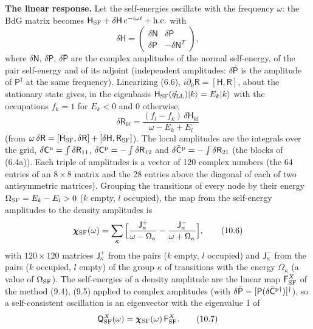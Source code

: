 \documentclass[
  10pt,
]{article}
\begin{document}
\textbf{The linear response.} Let the self-energies oscillate with the
frequency \(\omega\): the BdG matrix becomes
\(\mathsf H_{\rm SF}+\delta\mathsf H\,e^{-i\omega t}+{\rm h.c.}\) with
\[\delta\mathsf H=\begin{pmatrix}\delta\mathsf N&\delta\mathsf P\\\delta\bar{\mathsf P}&-\delta\mathsf N^T\end{pmatrix},\tag{10.4}\]
where \(\delta\mathsf N\), \(\delta\mathsf P\),
\(\delta\bar{\mathsf P}\) are the complex amplitudes of the normal
self-energy, of the pair self-energy and of its adjoint (independent
amplitudes: \(\delta\bar{\mathsf P}\) is the amplitude of
\(\mathsf P^\dagger\) at the same frequency). Linearizing (6.6),
\(i\partial_0\mathsf R=[\mathsf H,\mathsf R]\), about the stationary
state gives, in the eigenbasis
\(\mathsf H_{\rm SF}(\vec q_{\rm LL})\lvert k\rangle=E_k\lvert k\rangle\)
with the occupations \(f_k=1\) for \(E_k<0\) and \(0\) otherwise,
\[\delta\mathsf R_{kl}=\frac{(f_l-f_k)\,\delta\mathsf H_{kl}}{\omega-E_k+E_l}\tag{10.5}\]
(from
\(\omega\,\delta\mathsf R=[\mathsf H_{\rm SF},\delta\mathsf R]+[\delta\mathsf H,\mathsf R_{\rm SF}]\)).
The local amplitudes are the integrals over the grid,
\(\delta\mathsf C^{\rm n}=\int\delta\mathsf R_{11}\),
\(\delta\mathsf C^{\rm p}=-\int\delta\mathsf R_{12}\) and
\(\delta\bar{\mathsf C}^{\rm p}=-\int\delta\mathsf R_{21}\) (the blocks
of (6.4a)). Each triple of amplitudes is a vector of 120 complex numbers
(the 64 entries of an \(8\times8\) matrix and the 28 entries above the
diagonal of each of two antisymmetric matrices). Grouping the
transitions of every node by their energy \(\Omega_{\rm SF}=E_k-E_l>0\)
(\(k\) empty, \(l\) occupied), the map from the self-energy amplitudes
to the density amplitudes is
\[\boldsymbol\chi_{\rm SF}(\omega)=\sum_\kappa\Big[\frac{\mathsf J^+_\kappa}{\omega-\Omega_\kappa}-\frac{\mathsf J^-_\kappa}{\omega+\Omega_\kappa}\Big],\tag{10.6}\]
with \(120\times120\) matrices \(\mathsf J^+_\kappa\) from the pairs
(\(k\) empty, \(l\) occupied) and \(\mathsf J^-_\kappa\) from the pairs
(\(k\) occupied, \(l\) empty) of the group \(\kappa\) of transitions
with the energy \(\Omega_\kappa\) (a value of \(\Omega_{\rm SF}\)). The
self-energies of a density amplitude are the linear map
\(\mathsf F^X_{\rm SF}\) of the method (9.4), (9.5) applied to complex
amplitudes (with
\(\delta\bar{\mathsf P}=[\mathsf P(\delta\bar{\mathsf C}^{\rm p\dagger})]^\dagger\)),
so a self-consistent oscillation is an eigenvector with the eigenvalue 1
of
\[\mathsf Q^X_{\rm SF}(\omega)=\boldsymbol\chi_{\rm SF}(\omega)\,\mathsf F^X_{\rm SF}.\tag{10.7}\]
\end{document}
